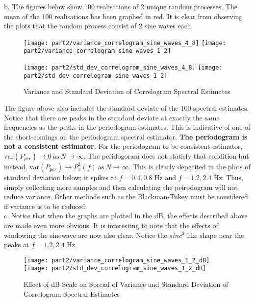 \noindent{}b. The figures below show 100 realisations of 2 unique random processes. The mean of the 100 realisations has been graphed in red. It is clear from observing the plots that the random process consist of 2 sine waves each.

\begin{figure}[H]
\centering{}
\texttt{[image: part2/variance\_correlogram\_sine\_waves\_4\_8]}
\texttt{[image: part2/variance\_correlogram\_sine\_waves\_1\_2]}
\end{figure}

\begin{figure}[H]
\centering{}
\texttt{[image: part2/std\_dev\_correlogram\_sine\_waves\_4\_8]}
\texttt{[image: part2/std\_dev\_correlogram\_sine\_waves\_1\_2]}
\caption{Variance and Standard Deviation of Correlogram Spectral Estimates}
\end{figure}

\noindent{}The figure above also includes the standard deviate of the 100 spectral estimates. Notice that there are peaks in the standard deviate at exactly the same frequencies as the peaks in the periodogram estimates. This is indicative of one of the short-comings on the periodogram spectral estimator. \textbf{The periodogram is not a consistent estimator.} For the periodogram to be consistent estimator, $\text{var}(P_{per}) \rightarrow 0  \ \text{as} \ N \rightarrow \infty$. The peridogoram does not statisfy that condition but instead,  $\text{var}(P_{per}) \rightarrow P_{x}^{2}(f) \ \text{as} \ N \rightarrow \infty$. This is clearly depecited in the plots of standard deviation below; it spikes at $f=0.4, 0.8$ Hz and $f=1.2, 2.4$ Hz. Thus, simply collecting more samples and then calculating the peirodogram will not reduce variance. Other methods such as the Blackman-Tukey must be considered if variance is to be reduced.\\

\noindent{}c. Notice that when the graphs are plotted in the dB, the effects described above are made even more obvious. It is interesting to note that the effects of windowing the sinewave are now also clear. Notice the $sinc^2$ like shape near the peaks at $f=1.2, 2.4$ Hz.
 
\begin{figure}[H]
\centering{}
\texttt{[image: part2/variance\_correlogram\_sine\_waves\_1\_2\_dB]}
\texttt{[image: part2/std\_dev\_correlogram\_sine\_waves\_1\_2\_dB]}
\caption{Effect of dB Scale on Spread of Variance and Standard Deviation of Correlogram Spectral Estimates}
\end{figure}

